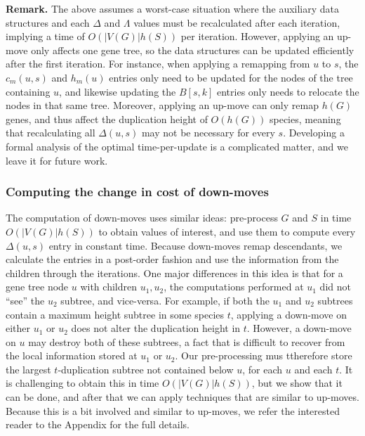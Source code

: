 \documentclass[10pt]{article}
\begin{document}
\textbf{Remark.}  The above assumes a worst-case situation where the auxiliary data structures and each $\Delta$ and $\Lambda$ values must be recalculated after each iteration, implying a time of $O(|V(G)|h(S))$ per iteration.  However, applying an up-move only affects one gene tree, so the data structures can be updated efficiently after the first iteration.  For instance, when applying a remapping from $u$ to $s$, the $c_m(u, s)$ and $h_m(u)$ entries only need to be updated for the nodes of the tree containing $u$, and likewise updating the $B[s, k]$ entries only needs to relocate the nodes in that same tree.  Moreover, applying an up-move can only remap $h(G)$ genes, and thus affect the duplication height of $O(h(G))$ species, meaning that recalculating all $\Delta(u, s)$ may not be necessary for every $s$.  Developing a formal analysis of the optimal time-per-update is a complicated matter, and we leave it for future work.












\subsubsection{Computing the change in cost of down-moves}

The computation of down-moves uses similar ideas: pre-process $G$ and $S$ in time $O(|V(G)|h(S))$ to obtain values of interest, and use them to compute every $\Delta(u, s)$ entry in constant time.  Because down-moves remap descendants, we calculate the entries in a post-order fashion and use the information from the children through the iterations.  One major differences in this idea is that for a gene tree node $u$ with children $u_1, u_2$, the computations performed at $u_1$ did not ``see'' the $u_2$ subtree, and vice-versa.  For example, if both the $u_1$ and $u_2$ subtrees contain a maximum height subtree in some species $t$, applying a down-move on either $u_1$ or $u_2$ does not alter the duplication height in $t$.  However, a down-move on $u$ may destroy both of these subtrees, a fact that is difficult to recover from the local information stored at $u_1$ or $u_2$.  Our pre-processing mus ttherefore store the largest $t$-duplication subtree not contained below $u$, for each $u$ and each $t$.  It is challenging to obtain this in time $O(|V(G)|h(S))$, but we show that it can be done, and after that we can apply techniques that are similar to up-moves.
Because this is a bit involved and similar to up-moves, we refer the interested reader to the Appendix for the full details.
\end{document}
